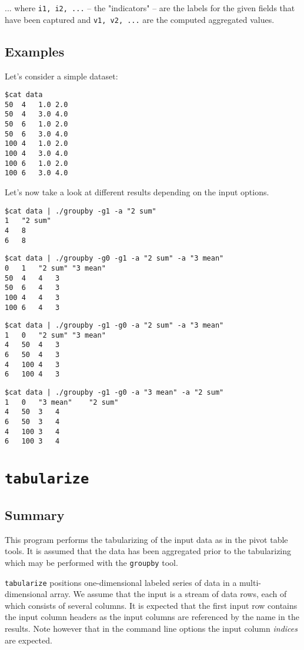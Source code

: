 \documentclass{report}
\begin{document}
... where \texttt{i1, i2, ...} -- the "indicators" -- are the labels for
the given fields that have been captured and \texttt{v1, v2, ...} are
the computed aggregated values.

\subsection{Examples}
Let's consider a simple dataset:
\begin{verbatim}
$cat data
50	4	1.0	2.0
50	4	3.0	4.0
50	6	1.0	2.0
50	6	3.0	4.0
100	4	1.0	2.0
100	4	3.0	4.0
100	6	1.0	2.0
100	6	3.0	4.0
\end{verbatim}

Let's now take a look at different results depending on the input options.

\begin{verbatim}
$cat data | ./groupby -g1 -a "2 sum"
1	"2 sum"
4	8
6	8
\end{verbatim}

\begin{verbatim}
$cat data | ./groupby -g0 -g1 -a "2 sum" -a "3 mean"
0	1	"2 sum"	"3 mean"
50	4	4	3
50	6	4	3
100	4	4	3
100	6	4	3
\end{verbatim}

\begin{verbatim}
$cat data | ./groupby -g1 -g0 -a "2 sum" -a "3 mean"
1	0	"2 sum"	"3 mean"
4	50	4	3
6	50	4	3
4	100	4	3
6	100	4	3
\end{verbatim}

\begin{verbatim}
$cat data | ./groupby -g1 -g0 -a "3 mean" -a "2 sum"
1	0	"3 mean"	"2 sum"
4	50	3	4
6	50	3	4
4	100	3	4
6	100	3	4
\end{verbatim}

\section{\texttt{tabularize}}

\subsection{Summary}
This program performs the tabularizing of the input data as in the pivot table
tools. It is assumed that the data has been aggregated prior to the tabularizing
which may be performed with the \texttt{groupby} tool.

\texttt{tabularize} positions one-dimensional labeled series of data in a
multi-dimensional array. We assume that the input is a stream of data rows,
each of which consists of several columns. It is expected that the first input 
row contains the input column headers as the input columns are referenced by the
name in the results. Note however that in the command line options the input
column \textit{indices} are expected.
\end{document}
